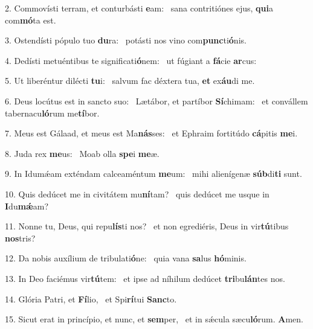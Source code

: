 2. Commovísti terram, et conturbásti \textbf{e}am: \ast\  sana contritiónes ejus, \textbf{qui}a com\textbf{mó}ta est.\

3. Ostendísti pópulo tuo \textbf{du}ra: \ast\  potásti nos vino com\textbf{punc}ti\textbf{ó}nis.\

4. Dedísti metuéntibus te significati\textbf{ó}nem: \ast\  ut fúgiant a \textbf{fá}cie \textbf{ar}cus:\

5. Ut liberéntur dilécti \textbf{tu}i: \ast\  salvum fac déxtera tua, \textbf{et} ex\textbf{áu}di me.\

6. Deus locútus est in sancto suo: \dag\  Lætábor, et partíbor \textbf{Sí}chimam: \ast\  et convállem tabernacu\textbf{ló}rum me\textbf{tí}bor.\

7. Meus est Gálaad, et meus est Ma\textbf{nás}ses: \ast\  et Ephraim fortitúdo \textbf{cá}pitis \textbf{me}i.\

8. Juda rex \textbf{me}us: \ast\  Moab olla \textbf{spe}i \textbf{me}æ.\

9. In Idumǽam exténdam calceaméntum \textbf{me}um: \ast\  mihi alienígenæ \textbf{súb}di\textbf{ti} sunt.\

10. Quis dedúcet me in civitátem mu\textbf{ní}tam? \ast\  quis dedúcet me usque in \textbf{I}du\textbf{mǽ}am?\

11. Nonne tu, Deus, qui repu\textbf{lís}ti nos? \ast\  et non egrediéris, Deus in vir\textbf{tú}tibus \textbf{nos}tris?\

12. Da nobis auxílium de tribulati\textbf{ó}ne: \ast\  quia vana \textbf{sa}lus \textbf{hó}minis.\

13. In Deo faciémus vir\textbf{tú}tem: \ast\  et ipse ad níhilum dedúcet \textbf{tri}bu\textbf{lán}tes nos.\

14. Glória Patri, et \textbf{Fí}lio, \ast\  et Spi\textbf{rí}tui \textbf{Sanc}to.\

15. Sicut erat in princípio, et nunc, et \textbf{sem}per, \ast\  et in sǽcula sæcu\textbf{ló}rum. \textbf{A}men.\

